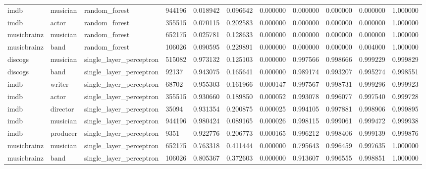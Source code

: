 \documentclass[epsfig,a4paper,11pt,titlepage,twoside,openany]{book}
\begin{document}
\begin{longtable}{|l|l|l|l|l|l|l|l|l|l|l|}
imdb        & musician & random\_forest                    & 944196 & 0.018942 & 0.096642 & 0.000000 & 0.000000 & 0.000000 & 0.000000 & 1.000000 \\
imdb        & actor    & random\_forest                    & 355515 & 0.070115 & 0.202583 & 0.000000 & 0.000000 & 0.000000 & 0.000000 & 1.000000 \\
musicbrainz & musician & random\_forest                    & 652175 & 0.025781 & 0.128633 & 0.000000 & 0.000000 & 0.000000 & 0.000000 & 1.000000 \\
musicbrainz & band     & random\_forest                    & 106026 & 0.090595 & 0.229891 & 0.000000 & 0.000000 & 0.000000 & 0.004000 & 1.000000 \\ \hline
discogs     & musician & single\_layer\_perceptron         & 515082 & 0.973132 & 0.125103 & 0.000000 & 0.997566 & 0.998666 & 0.999229 & 0.999829 \\
discogs     & band     & single\_layer\_perceptron         & 92137  & 0.943075 & 0.165641 & 0.000000 & 0.989174 & 0.993207 & 0.995274 & 0.998551 \\
imdb        & writer   & single\_layer\_perceptron         & 68702  & 0.955303 & 0.161966 & 0.000147 & 0.997567 & 0.998731 & 0.999296 & 0.999923 \\
imdb        & actor    & single\_layer\_perceptron         & 355515 & 0.930660 & 0.189850 & 0.000052 & 0.993078 & 0.996077 & 0.997540 & 0.999728 \\
imdb        & director & single\_layer\_perceptron         & 35094  & 0.931354 & 0.200875 & 0.000025 & 0.994105 & 0.997881 & 0.998906 & 0.999895 \\
imdb        & musician & single\_layer\_perceptron         & 944196 & 0.980424 & 0.089165 & 0.000026 & 0.998115 & 0.999061 & 0.999472 & 0.999938 \\
imdb        & producer & single\_layer\_perceptron         & 9351   & 0.922776 & 0.206773 & 0.000165 & 0.996212 & 0.998406 & 0.999139 & 0.999876 \\
musicbrainz & musician & single\_layer\_perceptron         & 652175 & 0.763318 & 0.411444 & 0.000000 & 0.795643 & 0.996459 & 0.997635 & 1.000000 \\
musicbrainz & band     & single\_layer\_perceptron         & 106026 & 0.805367 & 0.372603 & 0.000000 & 0.913607 & 0.996555 & 0.998851 & 1.000000 \\ \hline
\end{longtable}
\end{document}
